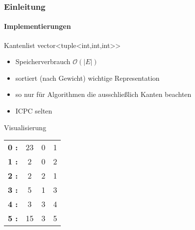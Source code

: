 \begin{frame}
    \frametitle{Einleitung}
    \framesubtitle{Implementierungen}
    \begin{KITexampleblock}{Kantenlist}
    vector<tuple<int,int,int>{}>
    \begin{itemize}
        \item Speicherverbrauch \( \mathcal{O}(|E|)\)
        \item sortiert (nach Gewicht) wichtige Representation
        \item so nur für Algorithmen die ausschließlich Kanten beachten
        \item ICPC selten
    \end{itemize}
    \end{KITexampleblock}
    \vspace{0.001em}
    \begin{KITinfoblock}{Visualisierung}
    \begin{tabular}{l c c c}
        \textbf{0 :  } & 23 & 0 & 1 \\
        \textbf{1 :  } & 2 & 0 & 2 \\
        \textbf{2 :  } & 2 & 2 & 1 \\
        \textbf{3 :  } & 5 & 1 & 3 \\
        \textbf{4 :  } & 3 & 3 & 4 \\
        \textbf{5 :  } & 15 & 3 & 5 \\
    \end{tabular}
    \end{KITinfoblock}
\end{frame}
